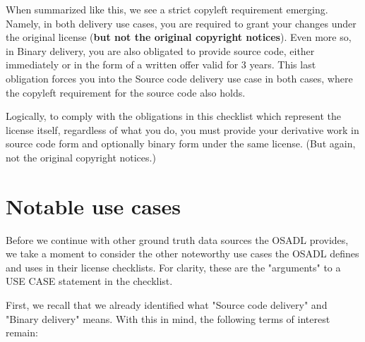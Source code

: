 When summarized like this, we see a strict copyleft requirement emerging. Namely, in both delivery use cases, you are required to grant your changes under the original license (\textbf{but not the original copyright notices}). Even more so, in Binary delivery, you are also obligated to provide source code, either immediately or in the form of a written offer valid for 3 years. This last obligation forces you into the Source code delivery use case in both cases, where the copyleft requirement for the source code also holds.

Logically, to comply with the obligations in this checklist which represent the license itself, regardless of what you do, you must provide your derivative work in source code form and optionally binary form under the same license. (But again, not the original copyright notices.)

\section{Notable use cases}

Before we continue with other ground truth data sources the OSADL provides, we take a moment to consider the other noteworthy use cases the OSADL defines and uses in their license checklists. For clarity, these are the "arguments" to a USE CASE statement in the checklist.

First, we recall that we already identified what "Source code delivery" and "Binary delivery" means. With this in mind, the following terms of interest remain:

